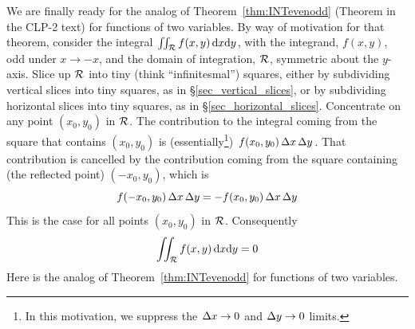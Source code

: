 We are finally ready for the analog of Theorem~\ref{thm:INTevenodd}
(Theorem  in the CLP-2 text)
for functions of two variables. By way of motivation for that theorem,
consider the integral $\iint_{\mathcal{R}} f(x,y)\,\mathrm{d}x\mathrm{d}y$, with the 
integrand, $f(x,y)$, odd under $x\rightarrow -x$, and the domain of integration, 
$\mathcal{R}$, symmetric about the $y$-axis. Slice up $\mathcal{R}$ into tiny (think 
``infinitesmal'') squares, either by subdividing vertical slices into tiny 
squares, as in \S\ref{sec_vertical_slices}, or by subdividing horizontal slices 
into tiny squares, as in \S\ref{sec_horizontal_slices}. Concentrate on any point 
$(x_0,y_0)$ in $\mathcal{R}$. 
The contribution to the integral coming from the square that contains
$(x_0,y_0)$ is (essentially\footnote{In this motivation, we suppress the 
$\Delta x\rightarrow 0$ and $\Delta y\rightarrow 0$ limits.}) 
$f(x_0,y_0)\,\Delta x\,\Delta y$. That contribution is cancelled by the contribution
coming from the square containing (the reflected point) $(-x_0,y_0)$, which is
\begin{equation*}
f(-x_0,y_0)\,\Delta x\,\Delta y = -f(x_0,y_0)\,\Delta x\,\Delta y
\end{equation*} 
This is the case for all points $(x_0,y_0)$ in $\mathcal{R}$. Consequently
\begin{equation*}
\iint_{\mathcal{R}} f(x,y)\,\mathrm{d}x\mathrm{d}y = 0
\end{equation*}
Here is the analog of Theorem~\ref{thm:INTevenodd} for functions of two variables.

